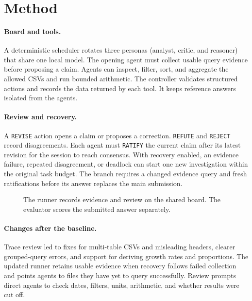 \documentclass[11pt,a4paper,twocolumn]{article}
\begin{document}
\section{Method}
\paragraph{Board and tools.} A deterministic scheduler rotates three personas (analyst, critic, and reasoner) that share one local model. The opening agent must collect usable query evidence before proposing a claim. Agents can inspect, filter, sort, and aggregate the allowed CSVs and run bounded arithmetic. The controller validates structured actions and records the data returned by each tool. It keeps reference answers isolated from the agents.

\paragraph{Review and recovery.} A \texttt{REVISE} action opens a claim or proposes a correction. \texttt{REFUTE} and \texttt{REJECT} record disagreements. Each agent must \texttt{RATIFY} the current claim after its latest revision for the session to reach consensus. With recovery enabled, an evidence failure, repeated disagreement, or deadlock can start one new investigation within the original task budget. The branch requires a changed evidence query and fresh ratifications before its answer replaces the main submission.

\begin{figure}[ht]
\centering
\setlength{\fboxsep}{6pt}
\caption{The runner records evidence and review on the shared board. The evaluator scores the submitted answer separately.}
\end{figure}

\paragraph{Changes after the baseline.} Trace review led to fixes for multi-table CSVs and misleading headers, clearer grouped-query errors, and support for deriving growth rates and proportions. The updated runner retains usable evidence when recovery follows failed collection and points agents to files they have yet to query successfully. Review prompts direct agents to check dates, filters, units, arithmetic, and whether results were cut off.
\end{document}
